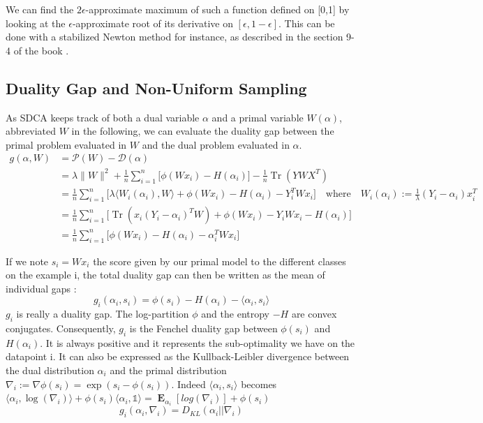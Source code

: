 \documentclass{article}
\DeclareMathOperator{\Tr}{Tr}
\DeclareMathOperator{\1}{\mathbb{1}}
\DeclareMathOperator{\E}{\mathbf{E}}
\begin{document}
We can find the $2\epsilon$-approximate maximum of such a function defined on [0,1] by looking at the $\epsilon$-approximate root of its derivative on $[\epsilon,1-\epsilon]$.
This can be done with a stabilized Newton method for instance, as described in the section 9-4 of the book \cite{press_numerical_1992}.


\subsection{Duality Gap and Non-Uniform Sampling}
As SDCA keeps track of both a dual variable $\alpha$ and a primal variable $W(\alpha)$, abbreviated $W$ in the following, we can evaluate the duality gap between the primal problem evaluated in $W$ and the dual problem evaluated in $\alpha$. 
\begin{align*}
	g(\alpha,W) & = \mathscr{P}(W) - \mathscr{D}(\alpha)\\
	& = \lambda \|W\|^2 	+\frac{1}{n}\sum_{i=1}^n \big[ \phi(Wx_i) - H(\alpha_i)\big] - \frac{1}{n}\Tr(Y W X^T) \\
	& = \frac{1}{n}\sum_{i=1}^n \big[ \lambda \langle W_i(\alpha_i),W\rangle + \phi(Wx_i) - H(\alpha_i) - Y_i^T W x_i\big] \quad \textrm{where} \quad W_i(\alpha_i) := \frac{1}{\lambda} (Y_i - \alpha_i) x_i^T \\
	& = \frac{1}{n}\sum_{i=1}^n \big[ \Tr(x_i (Y_i-\alpha_i)^T W) + \phi(Wx_i) - Y_i W x_i - H(\alpha_i)\big]\\
	& = \frac{1}{n}\sum_{i=1}^n \big[\phi(Wx_i) - H(\alpha_i) - \alpha_i^T W x_i\big]
\end{align*}

If we note $s_i=Wx_i$ the score given by our primal model to the different classes on the example i, the total duality gap can then be written as the mean of individual gaps : 
\begin{equation}
	g_i(\alpha_i,s_i) = \phi(s_i) - H(\alpha_i) - \langle\alpha_i, s_i\rangle
\end{equation}
$g_i$ is really a duality gap.
The log-partition $\phi$ and the entropy $-H$ are convex conjugates.
Consequently, $g_i$ is the Fenchel duality gap between $\phi(s_i)$ and $H(\alpha_i)$.
It is always positive and  it represents the sub-optimality we have on the datapoint i.
It can also be expressed as the Kullback-Leibler divergence between the dual distribution $\alpha_i$ and the primal distribution $\nabla_i := \nabla\phi(s_i) = \exp(s_i - \phi(s_i))$.
Indeed $\langle\alpha_i, s_i\rangle$ becomes $\langle\alpha_i, \log(\nabla_i)\rangle + \phi(s_i)\langle\alpha_i, \mathbb{1}\rangle = \E_{\alpha_i}[log(\nabla_i)] + \phi(s_i)$
\begin{equation}
	g_i(\alpha_i,\nabla_i) = D_{KL}(\alpha_i || \nabla_i)
\end{equation}
\end{document}
